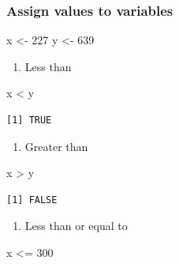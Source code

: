 \documentclass[
  letterpaper,
  DIV=11,
  numbers=noendperiod]{scrreprt}
\newenvironment{Shaded}{\begin{snugshade}}{\end{snugshade}}
\newcommand{\DecValTok}[1]{\textcolor[rgb]{0.68,0.00,0.00}{#1}}
\newcommand{\NormalTok}[1]{\textcolor[rgb]{0.00,0.23,0.31}{#1}}
\newcommand{\OtherTok}[1]{\textcolor[rgb]{0.00,0.23,0.31}{#1}}
\newcommand{\SpecialCharTok}[1]{\textcolor[rgb]{0.37,0.37,0.37}{#1}}
\providecommand{\tightlist}{%
  \setlength{\itemsep}{0pt}\setlength{\parskip}{0pt}}\usepackage{longtable,booktabs,array}
\begin{document}
\subsubsection{Assign values to
variables}\label{assign-values-to-variables}

\begin{Shaded}
\begin{Highlighting}[]
\NormalTok{x }\OtherTok{\textless{}{-}} \DecValTok{227}
\NormalTok{y }\OtherTok{\textless{}{-}} \DecValTok{639}
\end{Highlighting}
\end{Shaded}

\begin{enumerate}
\def\labelenumi{\alph{enumi}.}
\tightlist
\item
  Less than
\end{enumerate}

\begin{Shaded}
\begin{Highlighting}[]
\NormalTok{x }\SpecialCharTok{\textless{}}\NormalTok{ y}
\end{Highlighting}
\end{Shaded}

\begin{verbatim}
[1] TRUE
\end{verbatim}

\begin{enumerate}
\def\labelenumi{\alph{enumi}.}
\setcounter{enumi}{1}
\tightlist
\item
  Greater than
\end{enumerate}

\begin{Shaded}
\begin{Highlighting}[]
\NormalTok{x }\SpecialCharTok{\textgreater{}}\NormalTok{ y}
\end{Highlighting}
\end{Shaded}

\begin{verbatim}
[1] FALSE
\end{verbatim}

\begin{enumerate}
\def\labelenumi{\alph{enumi}.}
\setcounter{enumi}{2}
\tightlist
\item
  Less than or equal to
\end{enumerate}

\begin{Shaded}
\begin{Highlighting}[]
\NormalTok{x }\SpecialCharTok{\textless{}=} \DecValTok{300}
\end{Highlighting}
\end{Shaded}
\end{document}
